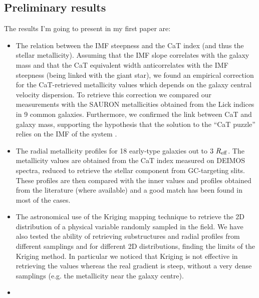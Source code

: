 	\subsection{Preliminary results}	%
	The results I'm going to present in my first paper are:
	\begin{itemize}
		\item	{
					The relation between the IMF steepness and the CaT index (and thus the stellar metallicity). 
					Assuming that the IMF slope correlates with the galaxy mass and that the CaT equivalent width 
					anticorrelates with the IMF steepness (being linked with the giant star), we found an empirical 
					correction for the CaT-retrieved metallicity values which depends on the galaxy central velocity 
					dispersion. 
					To retrieve this correction we compared our measurements with the SAURON metallicities obtained 
					from the Lick indices in 9 common galaxies. 
					Furthermore, we confirmed the link between CaT and galaxy mass, supporting the hypothesis that the 
					solution to the ``CaT puzzle'' relies on the IMF of the system \citep{Cenarro02}. 
					}
		\item	{
					The radial metallicity profiles for 18 early-type galaxies out to $3~R_{\rm{eff}}$. 
					The metallicity values are obtained from the CaT index measured on DEIMOS spectra, reduced to retrieve 
					the stellar component from GC-targeting slits. 
					These profiles are then compared with the inner values and profiles obtained from the literature (where 
					available) and a good match has been found in most of the cases. 
					}
		\item	{
					The astronomical use of the Kriging mapping technique to retrieve the 2D distribution of a 	
					physical variable randomly sampled in the field. 
					We have also tested the ability of retrieving substructures and radial profiles from different 
					samplings and for different 2D distributions, finding the limits of the Kriging method. 
					In particular we noticed that Kriging is not effective in retrieving the values whereas the real gradient is 
					steep, without a very dense samplings (e.g. the metallicity near the galaxy centre). 
					}
		\item	{
}
\end{itemize}
